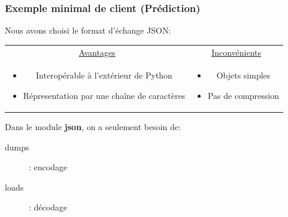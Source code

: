 \documentclass[11pt]{beamer}
\begin{document}
\begin{frame}
\frametitle{Exemple minimal de client (Prédiction)}
Nous avons choisi le format d'échange JSON:
\begin{center}
\begin{tabularx}{\textwidth}{cc}
\underline{Avantages} & \underline{Inconvénients} \\
\begin{minipage}[l]{.4\linewidth}
\vspace{5mm}
\begin{itemize}
\item Interopérable à l'extérieur de Python
\item Répresentation par une chaîne de caractères
\end{itemize}
\end{minipage}& 
\begin{minipage}[l]{.4\linewidth}
\begin{itemize}
\item Objets simples 
\item Pas de compression
\end{itemize}
\end{minipage}
\end{tabularx}
\end{center}
\pause

Dans le module \textbf{json}, on a seulement besoin de:
\begin{description}
\item[dumps] : encodage
\item[loads] : décodage 
\end{description}
\begin{flushright}
\end{flushright}
\end{frame}
\end{document}
